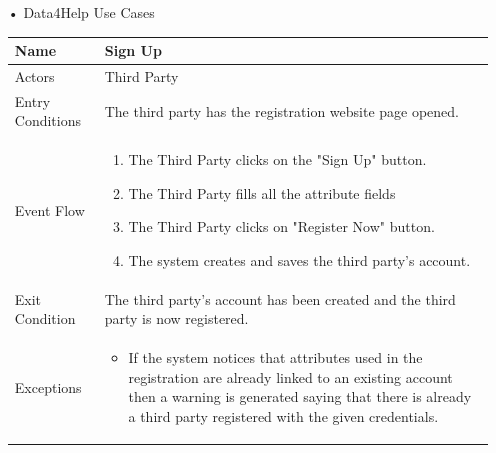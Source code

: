\begin{enumerate}
\FloatBarrier
\item[•]{\Large Data4Help Use Cases}
\FloatBarrier
\begin{table}[h]
\begin{tabular}{|l|p{}|}
\hline
Name             & Sign Up \\ \hline
Actors           & Third Party \\ \hline
Entry Conditions & The third party has the registration website page opened.    \\ \hline
Event Flow       & \begin{enumerate}
            \item The Third Party clicks on the "Sign Up" button.
            \item The Third Party fills all the attribute fields
            \item The Third Party clicks on "Register Now" button.
            \item The system creates and saves the third party's account.
        \end{enumerate}\\ \hline
Exit Condition   & The third party's account has been created and the third party is now registered.\\ \hline
Exceptions       & \begin{itemize}
\item If the system notices that attributes used in the registration are already linked to an existing account then a warning is generated saying that there is already a third party registered with the given credentials.
\end{itemize}\\ \hline
\end{tabular}
\end{table}
\FloatBarrier


\end{enumerate}
